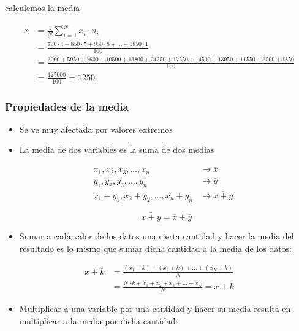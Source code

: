 \documentclass[]{article}
\providecommand{\tightlist}{%
  \setlength{\itemsep}{0pt}\setlength{\parskip}{0pt}}
\theoremstyle{plain}
\theoremstyle{definition}
\theoremstyle{definition} %
\begin{document}
calculemos la media

\begin{align*}
\overline x &= \frac{1}{N}\sum^{N}_{i=1} x_i  \cdot n_i\\
&= \frac{750  \cdot  4 + 850  \cdot  7 + 950 \cdot 8 +  \ldots + 1850 \cdot  1}{100}\\
& = \frac{3000  + 5950  + 7600  + 10500 + 13800 + 21250 + 17550 + 14500 + 13950 + 11550 + 3500  + 1850}{100}\\
&=\frac{125000}{100}=1250
\end{align*}

\hypertarget{propiedades-de-la-media}{%
\subsubsection{Propiedades de la media}\label{propiedades-de-la-media}}

\begin{itemize}
\item
  Se ve muy afectada por valores extremos
\item
  La media de dos variables es la suma de dos medias

  \begin{align*}
   x_1, x_2, x_3,\ldots , x_n &\longrightarrow \overline x\\
   y_1, y_2, y_3,\ldots , y_n &\longrightarrow \overline y
   &\\
   x_1 + y_1, x_2+y_2, \ldots , x_n + y_n & \longrightarrow \overline{x+y}
  \end{align*}

  \[\overline{x + y} = \overline x + \overline y\]
\item
  Sumar a cada valor de los datos una cierta cantidad y hacer la media
  del resultado es lo mismo que sumar dicha cantidad a la media de los
  datos:
\end{itemize}

\begin{align*}
\overline{x+k} &= \frac{(x_1 +k)+ (x_2+k) +\ldots  + (x_N +k) }{N}\\
&=\frac{N\cdot k + x_1+  x_2 +  x_3  +\ldots  +  x_N}{N} = \overline {x} +k
\end{align*}

\begin{itemize}
\tightlist
\item
  Multiplicar a una variable por una cantidad y hacer su media resulta
  en multiplicar a la media por dicha cantidad:
\end{itemize}
\end{document}

